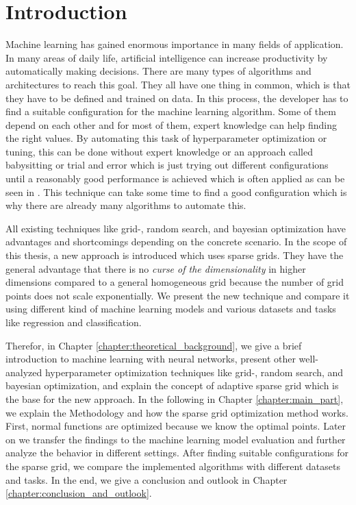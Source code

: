 
\chapter{Introduction}\label{chapter:introduction}

Machine learning has gained enormous importance in many fields of application. In many areas of daily life, artificial intelligence can increase productivity by automatically making decisions. There are many types of algorithms and architectures to reach this goal. They all have one thing in common, which is that they have to be defined and trained on data. In this process, the developer has to find a suitable configuration for the machine learning algorithm. Some of them depend on each other and for most of them, expert knowledge can help finding the right values. By automating this task of hyperparameter optimization or tuning, this can be done without expert knowledge or an approach called babysitting or trial and error which is just trying out different configurations until a reasonably good performance is achieved which is often applied as can be seen in \cite{MALAKOUTI2023200248, gorgolis2019hyperparameter}. This technique can take some time to find a good configuration which is why there are already many algorithms to automate this. \newline 

All existing techniques like grid-, random search, and bayesian optimization have advantages and shortcomings depending on the concrete scenario. In the scope of this thesis, a new approach is introduced which uses sparse grids. They have the general advantage that there is no \textit{curse of the dimensionality} in higher dimensions compared to a general homogeneous grid because the number of grid points does not scale exponentially. We present the new technique and compare it using different kind of machine learning models and various datasets and tasks like regression and classification. \newline 

Therefor, in Chapter \ref{chapter:theoretical_background}, we give a brief introduction to machine learning with neural networks, present other well-analyzed hyperparameter optimization techniques like grid-, random search, and bayesian optimization, and explain the concept of adaptive sparse grid which is the base for the new approach. In the following in Chapter \ref{chapter:main_part}, we explain the Methodology and how the sparse grid optimization method works. First, normal functions are optimized because we know the optimal points. Later on we transfer the findings to the machine learning model evaluation and further analyze the behavior in different settings. After finding suitable configurations for the sparse grid, we compare the implemented algorithms with different datasets and tasks. In the end, we give a conclusion and outlook in Chapter \ref{chapter:conclusion_and_outlook}.	



